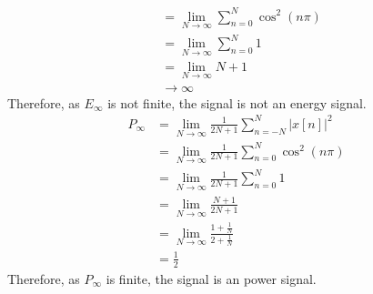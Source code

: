 \documentclass[fleqn, a4paper, 11pt, oneside]{amsart}
\theoremstyle{definition}
\theoremstyle{theorem}
\begin{document}
\begin{solution}
\begin{enumerate}[leftmargin=*]
\begin{align*}
                                           & = \lim\limits_{N \to \infty} \sum\limits_{n = 0}^{N} \cos^2(n \pi)          \\
                                           & = \lim\limits_{N \to \infty} \sum\limits_{n = 0}^{N} 1                      \\
                                           & = \lim\limits_{N \to \infty} N + 1                                          \\
                                           & \to \infty
			\end{align*}
			Therefore, as $E_{\infty}$ is not finite, the signal is not an energy signal.
			\begin{align*}
				P_{\infty} & = \lim\limits_{N \to \infty} \frac{1}{2 N + 1} \sum\limits_{n = -N}^{N} \left| x[n] \right|^2 \\
                                           & = \lim\limits_{N \to \infty} \frac{1}{2 N + 1} \sum\limits_{n = 0}^{N} \cos^2(n \pi)          \\
                                           & = \lim\limits_{N \to \infty} \frac{1}{2 N + 1} \sum\limits_{n = 0}^{N} 1                      \\
                                           & = \lim\limits_{N \to \infty} \frac{N + 1}{2 N + 1}                                            \\
                                           & = \lim\limits_{N \to \infty} \frac{1 + \frac{1}{N}}{2 + \frac{1}{N}}                          \\
                                           & = \frac{1}{2}
			\end{align*}
			Therefore, as $P_{\infty}$ is finite, the signal is an power signal.
	\end{enumerate}
\end{solution}
\end{document}
